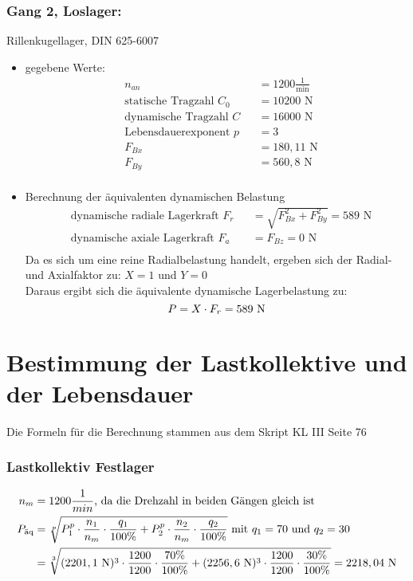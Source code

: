 \subsubsection{Gang 2, Loslager:} Rillenkugellager, DIN 625-6007\\
\begin{itemize}
	\item gegebene Werte:
	\begin{align*}
	&n_{an}&&= 1200 \frac{1}{\text{min}} \\
	&\text{statische Tragzahl } C_0 &&= 10200 \text{ N}\\
	&\text{dynamische Tragzahl } C &&= 16000 \text{ N} \\
	&\text{Lebensdauerexponent } p&&= 3  \\
	&F_{Bx} && = 180,11 \text{ N}\\
	&F_{By} && = 560,8 \text{ N}\\
	\end{align*} 
	\item Berechnung der äquivalenten dynamischen Belastung
	\begin{align*}
	&\text{dynamische radiale Lagerkraft } F_r&& = \sqrt{F_{Bx}^2 + F_{By}^2 } = 589 \text{ N} \\
	&\text{dynamische axiale Lagerkraft } F_a&& = F_{Bz} = 0\text{ N}\\
	\end{align*} 
	Da es sich um eine reine Radialbelastung handelt, ergeben sich der Radial- und Axialfaktor zu: $X= 1$ und $Y=0$\\
	Daraus ergibt sich die äquivalente dynamische Lagerbelastung zu:  
	\[
	P= X \cdot F_r = 589 \text{ N}
	\]
\end{itemize}
\newpage

\section{Bestimmung der Lastkollektive und der Lebensdauer}
Die Formeln für die Berechnung stammen aus dem Skript KL III Seite 76
\subsubsection{Lastkollektiv Festlager}
\begin{align*}
	n_m &= 1200 \frac{1}{min} \text{, da die Drehzahl in beiden Gängen gleich ist} \\
	P_{\text{äq}} &= \sqrt[p]{P_1 ^{p} \cdot \frac{n_1}{n_m} \cdot \frac{q_1}{100\% } + P_2 ^{p} \cdot \frac{n_2}{n_m} \cdot \frac{q_2}{100 \%}} \text{ mit $q_1 = 70$ und $q_2= 30$} \\
	&= \sqrt[3]{(2201,1 \text{ N}) ^{3} \cdot \frac{1200}{1200} \cdot \frac{70 \%}{100 \%} +(2256,6 \text{ N} )^{3} \cdot \frac{1200}{1200} \cdot \frac{30 \%}{100\% }} = 2218,04 \text{ N}\\
\end{align*}
